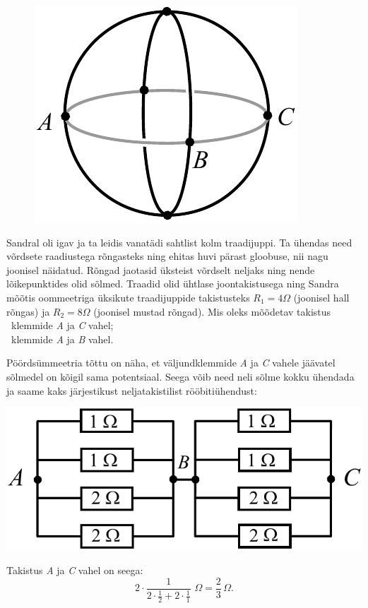 \setAuthor{}

\begin{figure}
  \vspace{-25pt}
  \begin{center}
  \includegraphics[scale=0.7]{2020-v3g-05-yl.pdf}
  \end{center}
  \vspace{-25pt}
\end{figure}
Sandral oli igav ja ta leidis vanatädi sahtlist kolm traadijuppi.
Ta ühendas need võrdsete raadiustega rõngasteks ning ehitas  huvi pärast gloobuse,
nii nagu joonisel näidatud. Rõngad jaotasid üksteist võrdselt neljaks ning nende
lõikepunktides olid sõlmed. Traadid olid ühtlase joontakistusega ning Sandra mõõtis
oommeetriga üksikute traadijuppide takistusteks $R_1=\SI{4}\Omega$ (joonisel hall
rõngas) ja $R_2=\SI{8}\Omega$ (joonisel mustad rõngad). Mis oleks mõõdetav takistus \\
\osa~klemmide \emph{A} ja \emph{C} vahel;\\
\osa~klemmide \emph{A} ja \emph{B} vahel.\\


\hint

\solu
\osa Pöördsümmeetria tõttu on näha, et väljundklemmide \emph{A} ja \emph{C} vahele jäävatel sõlmedel on kõigil sama potentsiaal. Seega võib need neli sõlme kokku ühendada ja saame kaks järjestikust neljatakistilist rööbitiühendust:\\
\begin{center}
\includegraphics[scale=0.8]{2020-v3g-05-sol1.pdf}\\
\end{center}
Takistus \emph{A} ja \emph{C} vahel on seega: $$2 \cdot \frac{1}{\displaystyle{2 \cdot \frac{1}{2} + 2 \cdot \frac{1}{1}}} \,\, \SI{}\Omega=\frac{2}{3} \, \SI{}\Omega.$$

